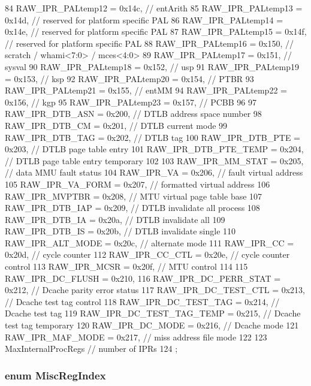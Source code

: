 \begin{DoxyCode}
{84     RAW_IPR_PALtemp12 = 0x14c,      // entArith
85     RAW_IPR_PALtemp13 = 0x14d,      // reserved for platform specific PAL
86     RAW_IPR_PALtemp14 = 0x14e,      // reserved for platform specific PAL
87     RAW_IPR_PALtemp15 = 0x14f,      // reserved for platform specific PAL
88     RAW_IPR_PALtemp16 = 0x150,      // scratch / whami<7:0> / mces<4:0>
89     RAW_IPR_PALtemp17 = 0x151,      // sysval
90     RAW_IPR_PALtemp18 = 0x152,      // usp
91     RAW_IPR_PALtemp19 = 0x153,      // ksp
92     RAW_IPR_PALtemp20 = 0x154,      // PTBR
93     RAW_IPR_PALtemp21 = 0x155,      // entMM
94     RAW_IPR_PALtemp22 = 0x156,      // kgp
95     RAW_IPR_PALtemp23 = 0x157,      // PCBB
96 
97     RAW_IPR_DTB_ASN = 0x200,        // DTLB address space number
98     RAW_IPR_DTB_CM = 0x201,         // DTLB current mode
99     RAW_IPR_DTB_TAG = 0x202,        // DTLB tag
100     RAW_IPR_DTB_PTE = 0x203,        // DTLB page table entry
101     RAW_IPR_DTB_PTE_TEMP = 0x204,   // DTLB page table entry temporary
102 
103     RAW_IPR_MM_STAT = 0x205,        // data MMU fault status
104     RAW_IPR_VA = 0x206,             // fault virtual address
105     RAW_IPR_VA_FORM = 0x207,        // formatted virtual address
106     RAW_IPR_MVPTBR = 0x208,         // MTU virtual page table base
107     RAW_IPR_DTB_IAP = 0x209,        // DTLB invalidate all process
108     RAW_IPR_DTB_IA = 0x20a,         // DTLB invalidate all
109     RAW_IPR_DTB_IS = 0x20b,         // DTLB invalidate single
110     RAW_IPR_ALT_MODE = 0x20c,       // alternate mode
111     RAW_IPR_CC = 0x20d,             // cycle counter
112     RAW_IPR_CC_CTL = 0x20e,         // cycle counter control
113     RAW_IPR_MCSR = 0x20f,           // MTU control
114 
115     RAW_IPR_DC_FLUSH = 0x210,
116     RAW_IPR_DC_PERR_STAT = 0x212,   // Dcache parity error status
117     RAW_IPR_DC_TEST_CTL = 0x213,    // Dcache test tag control
118     RAW_IPR_DC_TEST_TAG = 0x214,    // Dcache test tag
119     RAW_IPR_DC_TEST_TAG_TEMP = 0x215, // Dcache test tag temporary
120     RAW_IPR_DC_MODE = 0x216,        // Dcache mode
121     RAW_IPR_MAF_MODE = 0x217,       // miss address file mode
122 
123     MaxInternalProcRegs             // number of IPRs
124 };
\end{DoxyCode}
\hypertarget{namespaceAlphaISA_a1e522017e015d4c7efd6b2360143aa67}{
\subsubsection[{MiscRegIndex}]{\setlength{\rightskip}{0pt plus 5cm}enum {\bf MiscRegIndex}}}
